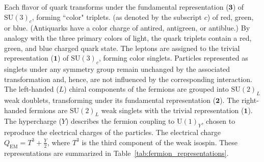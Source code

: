 Each flavor of quark transforms under the fundamental representation ($\mathbf{3}$) of $\mathrm{SU}(3)_c$, forming ``color" triplets.  (as denoted by the subscript $c$) of red, green, or blue. (Antiquarks have a color charge of antired, antigreen, or antiblue.) By analogy with the three primary colors of light, the quark triplets contain a red, green, and blue charged quark state. The leptons are assigned to the trivial representation ($\mathbf{1}$) of $\mathrm{SU}(3)_c$, forming color singlets. Particles represented as singlets under any symmetry group remain unchanged by the associated transformation and, hence, are not influenced by the corresponding interaction. The left-handed ($L$) chiral components of the fermions are grouped into $\mathrm{SU}(2)_L$ weak doublets, transforming under its fundamental representation ($\mathbf{2}$). The right-handed fermions are $\mathrm{SU}(2)_L$ weak singlets with the trivial representation ($\mathbf{1}$).  The hypercharge ($Y$) describes the fermion coupling to $\mathrm{U}(1)_Y$, chosen to reproduce the electrical charges of the particles. The electrical charge $Q_{\mathrm{EM}} = T^3 + \frac{Y}{2}$, where $T^3$ is the third component of the weak isospin. These representations are summarized in Table~\ref{tab:fermion_representations}.

